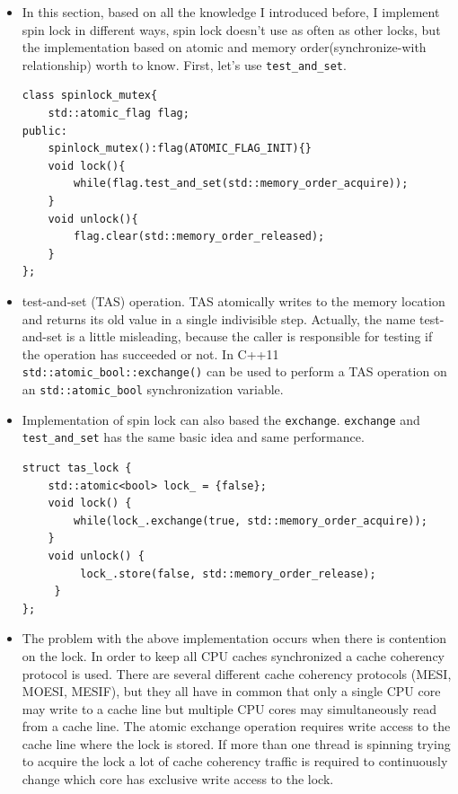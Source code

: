 \documentclass[a4paper,11pt,twoside]{book}
\begin{document}
\begin{itemize}
	
	\item In this section, based on all the knowledge I introduced before, I implement spin lock in different ways, spin lock doesn't use as often as other locks, but the implementation based on atomic and memory order(synchronize-with relationship) worth to know. First, let's use \texttt{test\_and\_set}.
\begin{lstlisting}
class spinlock_mutex{
	std::atomic_flag flag;
public:
	spinlock_mutex():flag(ATOMIC_FLAG_INIT){}
	void lock(){
		while(flag.test_and_set(std::memory_order_acquire));
	}
	void unlock(){
		flag.clear(std::memory_order_released);
	}
};	
\end{lstlisting}

	\item test-and-set (TAS) operation. TAS atomically writes to the memory location and returns its old value in a single indivisible step. Actually, the name test-and-set is a little misleading, because the caller is responsible for testing if the operation has succeeded or not. In C++11 \texttt{std::atomic\_bool::exchange()} can be used to perform a TAS operation on an \texttt{std::atomic\_bool} synchronization variable. 
		
	\item Implementation of spin lock can also based the \texttt{exchange}. \texttt{exchange} and \texttt{test\_and\_set} has the same basic idea and same performance. 
\begin{lstlisting}[]
struct tas_lock {
	std::atomic<bool> lock_ = {false};
	void lock() { 
		while(lock_.exchange(true, std::memory_order_acquire)); 
	}
	void unlock() {
		 lock_.store(false, std::memory_order_release); 
	 }
};	
\end{lstlisting}	
	
	\item The problem with the above implementation occurs when there is contention on the lock. In order to keep all CPU caches synchronized a cache coherency protocol is used. There are several different cache coherency protocols (MESI, MOESI, MESIF), but they all have in common that only a single CPU core may write to a cache line but multiple CPU cores may simultaneously read from a cache line. The atomic exchange operation requires write access to the cache line where the lock is stored. If more than one thread is spinning trying to acquire the lock a lot of cache coherency traffic is required to continuously change which core has exclusive write access to the lock.
	

\end{itemize}
\end{document}
